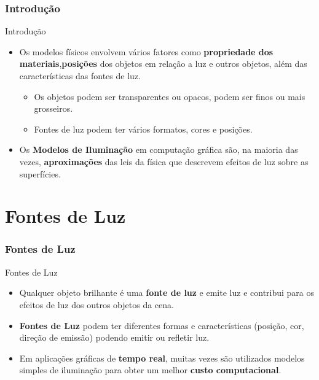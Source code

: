 \documentclass{beamer}
\begin{document}
\begin{frame}
\frametitle{Introdução}

		\begin{block}{Introdução}
		\begin{itemize}
			\item Os modelos físicos envolvem vários fatores como \textbf{propriedade dos materiais},\textbf{posições} dos objetos em relação a luz e outros objetos, além das características das fontes de luz.
			\begin{itemize}
				\item Os objetos podem ser transparentes ou opacos, podem ser finos ou  mais grosseiros.
				\item Fontes de luz podem ter vários formatos, cores e posições.
			\end{itemize}
			\item Os \textbf{Modelos de Iluminação} em computação gráfica são, na maioria das vezes, \textbf{aproximações} das leis da física que descrevem efeitos de luz sobre as superfícies.			 
		\end{itemize}
	\end{block}
	
\end{frame}



\section{Fontes de Luz}
\begin{frame}
\frametitle{Fontes de Luz}

	\begin{block}{Fontes de Luz}
		\begin{itemize}
			\item Qualquer objeto brilhante é uma \textbf{fonte de luz} e emite luz e contribui para os efeitos de luz dos outros objetos da cena.
			\item \textbf{Fontes de Luz} podem ter diferentes formas e características (posição, cor, direção de emissão) podendo emitir ou refletir luz.
			\item Em aplicações gráficas de \textbf{tempo real}, muitas vezes são utilizados modelos simples de iluminação para obter um melhor \textbf{custo computacional}.
		\end{itemize}
	\end{block}
\end{frame}
\end{document}
